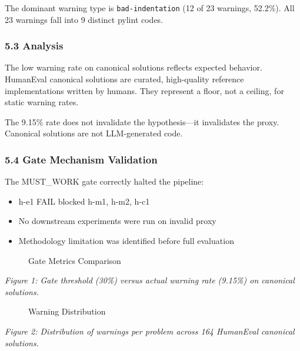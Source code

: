The dominant warning type is \texttt{bad-indentation} (12 of 23 warnings, 52.2\%). All 23 warnings fall into 9 distinct pylint codes.

\subsubsection{5.3 Analysis}

The low warning rate on canonical solutions reflects expected behavior. HumanEval canonical solutions are curated, high-quality reference implementations written by humans. They represent a floor, not a ceiling, for static warning rates.

The 9.15\% rate does not invalidate the hypothesis---it invalidates the proxy. Canonical solutions are not LLM-generated code.

\subsubsection{5.4 Gate Mechanism Validation}

The MUST\_WORK gate correctly halted the pipeline:
\begin{itemize}
\item h-e1 FAIL blocked h-m1, h-m2, h-c1
\item No downstream experiments were run on invalid proxy
\item Methodology limitation was identified before full evaluation
\end{itemize}

\begin{figure}[htbp]
\centering
\caption{Gate Metrics Comparison}
\label{fig:gate_metrics}
\end{figure}

\textit{Figure 1: Gate threshold (30\%) versus actual warning rate (9.15\%) on canonical solutions.}

\begin{figure}[htbp]
\centering
\caption{Warning Distribution}
\label{fig:warning_distribution}
\end{figure}

\textit{Figure 2: Distribution of warnings per problem across 164 HumanEval canonical solutions.}
